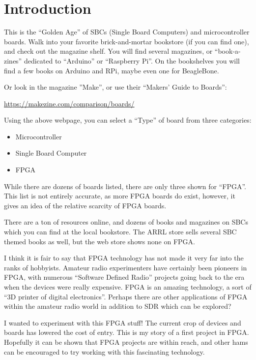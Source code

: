 \section{Introduction}

This is the ``Golden Age'' of SBCs (Single Board Computers) and microcontroller boards.
Walk into your favorite brick-and-mortar bookstore (if you can find one), 
and check out the magazine shelf.  You will find several magazines, or ``book-a-zines''
dedicated to ``Arduino'' or ``Raspberry Pi''.  On the bookshelves you will find a few books on Arduino and RPi, maybe even one for BeagleBone.

Or look in the magazine ''Make'', or use their ``Makers’ Guide to Boards'':

\url{https://makezine.com/comparison/boards/}

Using the above webpage, you can select a ``Type'' of board from three categories:

\begin{itemize}
	\item Microcontroller
	\item Single Board Computer
	\item FPGA
\end{itemize}

While there are dozens of boards listed, there are only three shown for ``FPGA''.
This list is not entirely accurate, as more FPGA boards do exist, however, it gives
an idea of the relative scarcity of FPGA boards.

There are a ton of resources online, and dozens of books and magazines on SBCs which you can find at the local bookstore.
The ARRL store sells several SBC themed books as well, but the web store shows none on FPGA.

I think it is fair to say that FPGA technology has not made it very far into the ranks of hobbyists.
Amateur radio experimenters have certainly been pioneers in FPGA, with numerous ``Software Defined Radio''
projects going back to the era when the devices were really expensive.  FPGA is an amazing technology, a sort of ``3D printer of digital electronics''.  Perhaps there are other applications of FPGA within the amateur radio world in addition to SDR which can be explored?

I wanted to experiment with this FPGA stuff! The current crop of devices and boards has lowered the cost of entry.  This is my story of a first project in FPGA.  Hopefully it can be shown that FPGA projects are within reach, and other hams can be encouraged to try working with this fascinating technology.

